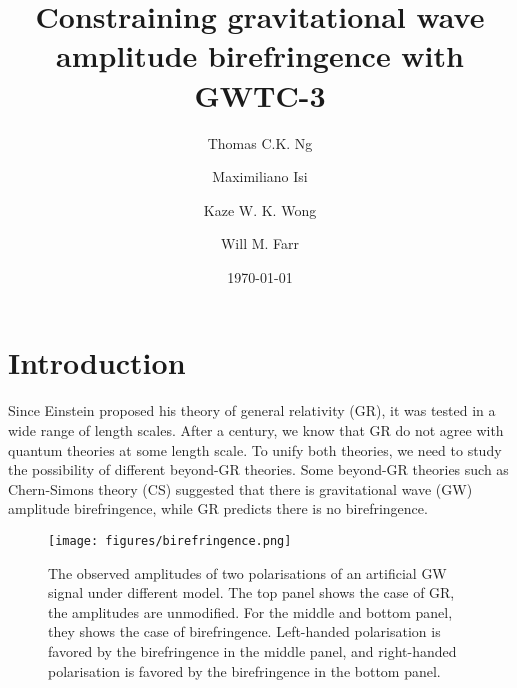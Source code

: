 \documentclass[twocolumn]{aastex631}
\begin{document}
\title{Constraining gravitational wave amplitude birefringence with GWTC-3}

\author{Thomas C.K. Ng}

\author{Maximiliano Isi}

\author{Kaze W. K. Wong}

\author{Will M. Farr}

\date{\today}

\begin{abstract}

\end{abstract}

\section{Introduction}

Since Einstein proposed his theory of general relativity (GR), it was tested in a wide range of length scales.
After a century, we know that GR do not agree with quantum theories at some length scale.
To unify both theories, we need to study the possibility of different beyond-GR theories.
Some beyond-GR theories such as Chern-Simons theory (CS) suggested that there is gravitational wave (GW) amplitude birefringence,
while GR predicts there is no birefringence.

\begin{figure}[h!]
    \texttt{[image: figures/birefringence.png]}
    \caption{
        The observed amplitudes of two polarisations of an artificial GW signal under different model.
        The top panel shows the case of GR, the amplitudes are unmodified.
        For the middle and bottom panel, they shows the case of birefringence.
        Left-handed polarisation is favored by the birefringence in the middle panel,
        and right-handed polarisation is favored by the birefringence in the bottom panel.
    }
    \label{fig:birefringence}
\end{figure}
\end{document}
